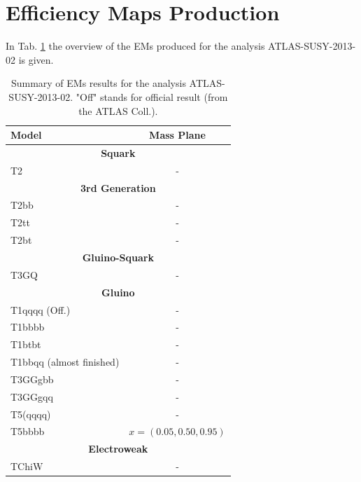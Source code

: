 \documentclass[a4paper,11pt]{article}
\begin{document}
\section{Efficiency Maps Production}
In Tab. \ref{EM} the overview of the EMs produced for the analysis ATLAS-SUSY-2013-02 is given. 
\begin{table}[!h]
\centering
\renewcommand{\arraystretch}{1.2}
\small
\begin{tabular}{ l  c } \toprule \toprule 
	
\textbf{Model} & \textbf{Mass Plane} \\ \toprule \toprule 
\multicolumn{2}{c}{\textbf{Squark}}  \\ \hline
T2 & - \\
\multicolumn{2}{c}{\textbf{3rd Generation}}  \\ \hline
T2bb & - \\
T2tt & - \\
T2bt & - \\

\multicolumn{2}{c}{\textbf{Gluino-Squark}}  \\ \hline
T3GQ & - \\

\multicolumn{2}{c}{\textbf{Gluino} }  \\ \hline
T1qqqq (Off.) & - \\
T1bbbb & - \\
T1btbt & - \\
T1bbqq (almost finished) & - \\
T3GGgbb & - \\
T3GGgqq & - \\
T5(qqqq) & - \\
T5bbbb & $x=(0.05, 0.50, 0.95)$ \\

\multicolumn{2}{c}{\textbf{Electroweak} } \\ \hline
TChiW & - 

    \bottomrule 
  \end{tabular}
  \caption{Summary of EMs results for the analysis ATLAS-SUSY-2013-02. "Off" stands for official result (from the ATLAS Coll.).}
  \label{EM}
\end{table}
\end{document}
